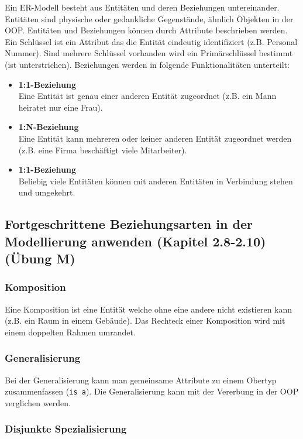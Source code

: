 Ein ER-Modell besteht aus Entitäten und deren Beziehungen untereinander. Entitäten sind physische oder gedankliche Gegenstände, ähnlich Objekten in der OOP. Entitäten und Beziehungen können durch Attribute beschrieben werden. Ein Schlüssel ist ein Attribut das die Entität eindeutig identifiziert (z.B. Personal Nummer). Sind mehrere Schlüssel vorhanden wird ein Primärschlüssel bestimmt (ist unterstrichen). Beziehungen werden in folgende Funktionalitäten unterteilt:

\begin{itemize}
	\item \textbf{1:1-Beziehung} \\
		  Eine Entität ist genau einer anderen Entität zugeordnet (z.B. ein Mann heiratet nur eine Frau). 
	\item \textbf{1:N-Beziehung} \\
		  Eine Entität kann mehreren oder keiner anderen Entität zugeordnet werden (z.B. eine Firma beschäftigt viele Mitarbeiter).
	\item \textbf{1:1-Beziehung} \\
		  Beliebig viele Entitäten können mit anderen Entitäten in Verbindung stehen und umgekehrt.
\end{itemize}

\subsection{Fortgeschrittene Beziehungsarten in der Modellierung anwenden (Kapitel 2.8-2.10) (Übung M)}

\subsubsection{Komposition}

Eine Komposition ist eine Entität welche ohne eine andere nicht existieren kann (z.B. ein Raum in einem Gebäude). Das Rechteck einer Komposition wird mit einem doppelten Rahmen umrandet. 

\subsubsection{Generalisierung}

Bei der Generalisierung kann man gemeinsame Attribute zu einem Obertyp zusammenfassen (\verb|is a|). Die Generalisierung kann mit der Vererbung in der OOP verglichen werden.

\subsubsection{Disjunkte Spezialisierung}

